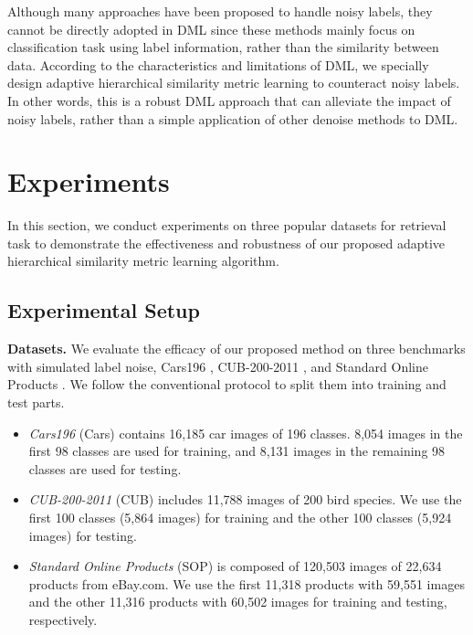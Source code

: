 \documentclass[lettersize,journal]{IEEEtran}
\begin{document}
Although many approaches \cite{sugiyama2018co,yu2019does,wei2020combating} have been proposed to handle noisy labels, they cannot be directly adopted in DML since these methods mainly focus on  classification task using label information, rather than the similarity between data.
According to the characteristics and limitations of DML, we specially design adaptive hierarchical similarity metric learning to counteract noisy labels. In other words, this is a robust DML approach that can alleviate the impact of noisy labels, rather than a simple application of other denoise methods to DML. 

\section{Experiments}
\label{experiment}
In this section, we conduct experiments on three popular  datasets for retrieval task to demonstrate the effectiveness  and robustness of our proposed adaptive hierarchical similarity metric learning algorithm.

\subsection{Experimental Setup}

\textbf{Datasets.} We evaluate the efficacy of our proposed method on three benchmarks with simulated label noise, Cars196 \cite{krause20133d}, CUB-200-2011 \cite{wah2011caltech}, and Standard Online Products  \cite{oh2016deep}. We follow the conventional protocol \cite{oh2016deep,oh2017deep} to split them into training and test parts.
\begin{itemize}
	\item \textit{Cars196} \cite{krause20133d} (Cars) contains 16,185 car images of 196 classes. 8,054 images in the first 98 classes are used for training, and 8,131 images in the remaining 98 classes are used for testing. 
	
	\item \textit{CUB-200-2011} \cite{wah2011caltech} (CUB) includes 11,788 images of 200 bird species. We use the first 100 classes (5,864 images) for training and the other 100 classes (5,924 images) for testing. 
	
	\item \textit{Standard Online Products} \cite{oh2016deep} (SOP) is composed of 120,503 images of 22,634 products from eBay.com. We use the first 11,318 products with 59,551 images and the other 11,316 products with 60,502 images for training and testing, respectively.
	
\end{itemize}
\end{document}
